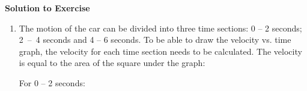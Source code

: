 {\begin{mdframed}[linewidth=4, leftmargin=40, rightmargin=40]
\begin{exercise}
    \addtocounter{footnote}{-0}
    
      \par 
      
      \vspace{5pt}
      \label{m38795*solfhsst!!!underscore!!!id3768}\noindent\textbf{Solution to Exercise } \label{m38795*listfhsst!!!underscore!!!id3768}\begin{enumerate}[noitemsep, label=\textbf{Step} \textbf{\arabic*}. ] 
            \leftskip=20pt\rightskip=\leftskip\item  
      \label{m38795*id74944}The motion of the car can be divided into three time sections: 0 -- 2 seconds; 2~--~4 seconds and 4 -- 6 seconds. To be able to draw the velocity vs. time graph, the velocity for each time section needs to be calculated. The velocity is equal to the area of the square under the graph:\par 
      \label{m38795*id74953}For 0 -- 2 seconds:
\label{m38795*id74963}\nopagebreak\noindent{}
\end{enumerate}
\end{exercise}
\end{mdframed}}
